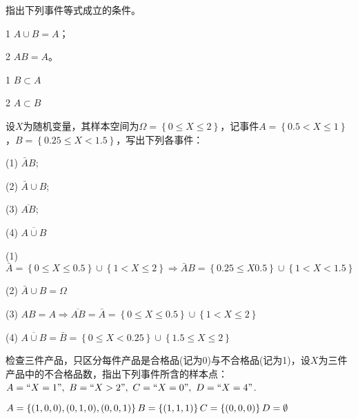 \documentclass[lang=cn,newtx,10pt,scheme=chinese]{elegantbook}
\begin{document}
\begin{problemset}[习题 1.1]
    \item 指出下列事件等式成立的条件。
    \item[1] $A \cup B = A$；
    \item[2] $AB=A$。
    \begin{solution}
        \begin{framed}
            \item[1] $B \subset A$
            \item[2] $A \subset B$
        \end{framed}
    \end{solution}
    \newpage

    \item 设$X$为随机变量，其样本空间为$\Omega=\left\{0 \leq X \leq 2\right\}$，记事件$A=\left\{0.5 < X \leq 1\right\}$，$B=\left\{0.25 \leq X < 1.5\right\}$，写出下列各事件：
    \item[(1)] $\bar{A}B$;
    \item[(2)] $\bar{A} \cup B$;
    \item[(3)] $\overline{AB}$;
    \item[(4)] $\overline{A \cup B}$
    \begin{solution}
        \begin{framed}
            \item[(1)] $\bar A = \left\{0 \leq X \leq 0.5\right\} \cup \left\{ 1 < X \leq 2\right\} \Rightarrow \bar{A}B=\left\{0.25 \leq X 0.5\right\} \cup \left\{ 1 < X < 1.5\right\}$
            \item[(2)] $\bar{A} \cup B = \Omega$
            \item[(3)] $AB = A \Rightarrow \overline{AB} = \bar{A} = \left\{0 \leq X \leq 0.5\right\} \cup \left\{ 1 < X \leq 2\right\}$
            \item[(4)] $\overline{A \cup B}=\bar{B}=\left\{0 \leq X < 0.25\right\} \cup \left\{1.5 \leq X \leq 2\right\}$
        \end{framed}
    \end{solution}

    \item  检查三件产品，只区分每件产品是合格品(记为0)与不合格品(记为1)，设$X$为三件产品中的不合格品数，指出下列事件所含的样本点：\\
    $A=``X=1",\ B=``X>2",\ C=``X=0",\ D=``X=4"$.
    \begin{solution}
        \begin{framed}
            $A=\left\{(1,0,0),(0,1,0),(0,0,1)\right\}\\
            B=\left\{(1,1,1)\right\}\\
            C=\left\{(0,0,0)\right\}\\
            D=\emptyset$
        \end{framed}
    \end{solution}


\end{problemset}
\end{document}
